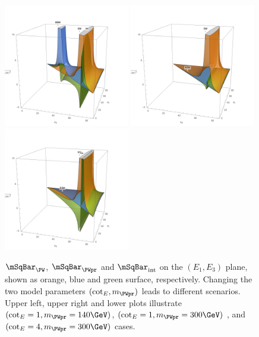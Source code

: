 \begin{figure}[ht]
    \centering
    \includegraphics[width=0.49\textwidth]{chapters/RelatedWorks/sectionBSM/figures/WPrime_140_1.png}
    \includegraphics[width=0.49\textwidth]{chapters/RelatedWorks/sectionBSM/figures/WPrime_300_1.png}
    \includegraphics[width=0.49\textwidth]{chapters/RelatedWorks/sectionBSM/figures/WPrime_300_4.png}
    \caption{ $\mSqBar _{\PW}$, $\mSqBar _{\PWpr} $ and $\mSqBar _{\mathrm{int}}$ on the $(E_1,E_3)$ plane, shown as orange, blue and green surface, respectively. Changing the two model parameters $(\cot_E, m_{\PWpr})$ leads to different scenarios. Upper left, upper right and lower plots illustrate  $(\cot_E=1, m_{\PWpr}=140  \GeV )$, $(\cot_E=1, m_{\PWpr}=300  \GeV )$ , and $(\cot_E=4, m_{\PWpr}=300  \GeV )$ cases. }
    \label{fig:relatedWorks:bsm:WPrime:m2}
\end{figure}



